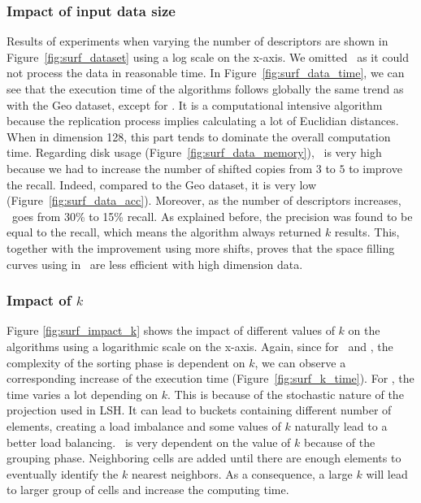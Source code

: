 \subsubsection{Impact of input data size}

Results of experiments when varying the number of descriptors are shown in Figure~\ref{fig:surf_dataset} using a log 
scale on the x-axis. We omitted \HBK~as it could not process the data in reasonable time.
In Figure~\ref{fig:surf_data_time}, we can see that the execution time of the algorithms follows globally 
the same trend as 
with the Geo dataset, except for \VO. It is a computational intensive algorithm because the replication process implies 
calculating a lot of Euclidian distances. When in dimension 128, this part tends to dominate the overall computation 
time. Regarding disk usage (Figure~\ref{fig:surf_data_memory}), \Z~is very high because  we had to increase the number 
of shifted copies from $3$ to $5$ to 
improve the recall. Indeed, compared to the Geo dataset, it is very low (Figure~\ref{fig:surf_data_acc}). Moreover, as 
the number of descriptors 
increases, \Z~goes from 30\% to 15\% recall. As explained before, the precision was found to be equal to the recall, which means the 
algorithm always returned $k$ results. This, together with the improvement using more shifts, proves that the 
space filling curves using in \Z~are less efficient with high dimension data. 

\subsubsection{Impact of $k$}

Figure \ref{fig:surf_impact_k} shows the impact of different values of $k$ on the algorithms using a logarithmic scale 
on the x-axis.
Again, since for \HBNLJ~and \Z, the complexity of the sorting phase is dependent on $k$, we can observe a 
corresponding increase of the execution time (Figure~\ref{fig:surf_k_time}). For 
\LSH, the time varies a lot depending on $k$. This is because of the stochastic nature of the projection used in 
LSH. It can lead to buckets containing different number of elements, creating a load imbalance and some values
of $k$ naturally lead to a better load balancing. \VO~is very dependent on the value of $k$ because of the grouping 
phase. Neighboring cells are added until there are enough elements to eventually identify the $k$ nearest neighbors. 
As a consequence, a large $k$ will lead to larger group of cells and increase the computing time. 

